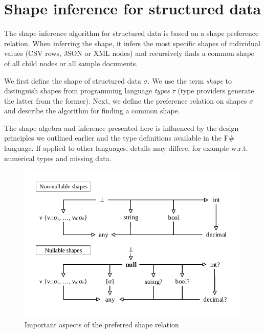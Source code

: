 \documentclass[10pt,preprint,blind,clearpagebib]{sigplanconf}
\begin{document}
\section{Shape inference for structured data}
\label{sec:inference}

The shape inference algorithm for structured data is based on a shape preference relation. When 
inferring the shape, it infers the most specific shapes of individual values (CSV rows, JSON or XML 
nodes) and recursively finds a common shape of all child nodes or all sample documents.

We first define the shape of structured data $\sigma$. We use the term \emph{shape} to distinguish 
shapes from programming language \emph{types} $\tau$ (type providers generate the latter from the former). 
Next, we define the preference relation on shapes $\sigma$ and describe the algorithm 
for finding a common shape. 

The shape algebra and inference presented here is influenced by the design principles
we outlined earlier and the type definitions available in the F\# language.
If applied to other languages, details may differe, for example
w.r.t. numerical types and missing data.



\begin{figure}
\begin{center}
\includegraphics[scale=0.80,trim=5mm 5mm 5mm 5mm,clip]{images/hierarchy.pdf} %
\end{center}
\vspace{-0.5em}
\caption{Important aspects of the preferred shape relation}
\label{fig:subtyping-diagram}
\vspace{-0.5em}
\end{figure}
\end{document}
